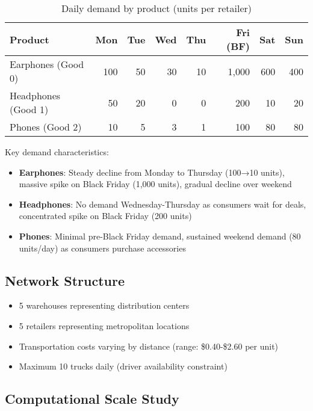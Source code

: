\documentclass[a4paper,12pt]{article}
\begin{document}
\begin{table}[h]
\centering
\caption{Daily demand by product (units per retailer)}
\begin{tabular}{lrrrrrrr}
\toprule
Product & Mon & Tue & Wed & Thu & Fri (BF) & Sat & Sun \\
\midrule
Earphones (Good 0) & 100 & 50 & 30 & 10 & 1,000 & 600 & 400 \\
Headphones (Good 1) & 50 & 20 & 0 & 0 & 200 & 10 & 20 \\
Phones (Good 2) & 10 & 5 & 3 & 1 & 100 & 80 & 80 \\
\bottomrule
\end{tabular}\label{tab:table2}
\end{table}

Key demand characteristics:
\begin{itemize}
    \item \textbf{Earphones}: Steady decline from Monday to Thursday (100→10 units), massive spike on Black Friday (1,000 units), gradual decline over weekend
    \item \textbf{Headphones}: No demand Wednesday-Thursday as consumers wait for deals, concentrated spike on Black Friday (200 units)
    \item \textbf{Phones}: Minimal pre-Black Friday demand, sustained weekend demand (80 units/day) as consumers purchase accessories
\end{itemize}

\subsection{Network Structure}\label{subsec:network-structure}
\begin{itemize}
    \item 5 warehouses representing distribution centers
    \item 5 retailers representing metropolitan locations
    \item Transportation costs varying by distance (range: \$0.40-\$2.60 per unit)
    \item Maximum 10 trucks daily (driver availability constraint)
\end{itemize}

\subsection{Computational Scale Study}\label{subsec:computational-scale-study}
\end{document}
